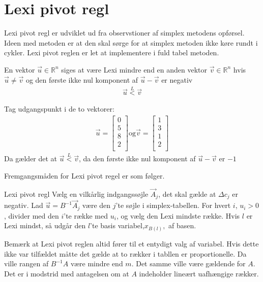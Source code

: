 \section{Lexi pivot regl}
Lexi pivot regl er udviklet ud fra observstioner af simplex metodens opførsel. Ideen med metoden er at den skal sørge for at simplex metoden ikke køre rundt i cykler. Lexi pivot reglen er let at implementere i fuld tabel metoden. 
\begin{defn}
En vektor $\vec{u} \in \mathds{R}^n$ siges at være Lexi mindre end en anden vektor $\vec{v} \in \mathds{R}^n$ hvis $\vec{u} \neq \vec{v}$ og den første ikke nul komponent af $\vec{u}-\vec{v}$ er negativ 
\begin{align*}
\vec{u} \overset{L}{<} \vec{v}
\end{align*}
\end{defn}
\begin{eks}
Tag udgangspunkt i de to vektorer: 
\begin{align*}
\vec{u}=
\begin{bmatrix}
0\\
5\\
8\\
2\\
\end{bmatrix}
\text{og}
\vec{v}= 
\begin{bmatrix}
1\\
3\\
1\\
2\\
\end{bmatrix}
\end{align*}
Da gælder det at $\vec{u} \overset{L}{<} \vec{v}$, da den første ikke nul komponent af $\vec{u}-\vec{v}$ er $-1$
\end{eks}

Fremgangsmåden for Lexi pivot regel er som følger.
  
\begin{pro}{Lexi pivot regl}
Vælg en vilkårlig indgangssøjle $\vec{A}_j$, det skal gælde at $\Delta c_j$ er negativ. Lad $\vec{u}=B^{-1}\vec{A}_j$ være den $j$'te søjle i simplex-tabellen.
For hvert $i$, $u_i>0$, divider med den $i$'te række med $u_i$, og vælg den Lexi mindste række. Hvis $l$ er Lexi mindst, så udgår den $l$'te basis variabel,$x_{B(l)},$ af basen. 
\end{pro}

Bemærk at Lexi pivot reglen altid fører til et entydigt valg af variabel. Hvis dette ikke var tilfældet måtte det gælde at to rækker i tabllen er proportionelle. Da ville rangen af $B^{-1}A$ være mindre end $m$. Det samme ville være gældende for $A$. Det er i modstrid med antagelsen om at $A$ indeholder lineært uafhængige rækker. 

